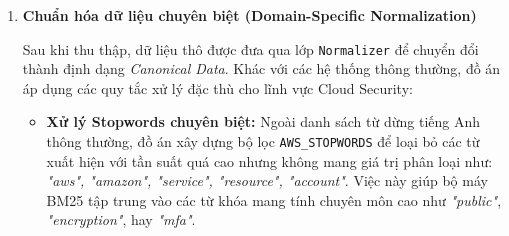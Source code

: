 \begin{enumerate}
\begin{itemize}
    \item \textbf{Cơ chế thực thi:} Sử dụng thư viện chuẩn của Python để duyệt đệ quy qua cấu trúc thư mục các provider AWS của thư viện Prowler đã cài đặt.
    \item \textbf{Dữ liệu trích xuất:} Hệ thống tập trung thu thập các tệp metadata dạng JSON. Mỗi tệp này chứa đầy đủ thông tin về một bài kiểm tra an ninh, bao gồm: \textit{CheckID}, mã lệnh khắc phục (\textit{Remediation Code}), mức độ nghiêm trọng và các rủi ro liên quan.
\end{itemize}


    \subsubsection*{Thu thập dữ liệu chiến lược từ AWS Security Maturity Model}
    \begin{itemize}
    \item \textbf{Chiến lược quét theo giai đoạn:} Agent thực hiện quét theo 4 giai đoạn (\textit{Phases}) của mô hình trưởng thành: \textit{Quick Wins, Foundational, Efficient} và \textit{Optimized}.
    \item \textbf{Bóc tách ngữ nghĩa dựa trên tiêu đề:} Thay vì lấy văn bản thô, Agent sử dụng \texttt{BeautifulSoup} để phân tích cấu trúc HTML, trích xuất thông tin theo các từ khóa mục tiêu (\textit{Keywords}) như: \textit{Risk Mitigation}, \textit{How to check}, và \textit{Guidance for assessments}.
\end{itemize}


    \item \textbf{Chuẩn hóa dữ liệu chuyên biệt (Domain-Specific Normalization)}

    Sau khi thu thập, dữ liệu thô được đưa qua lớp \texttt{Normalizer} để chuyển đổi thành định dạng \textit{Canonical Data}. Khác với các hệ thống thông thường, đồ án áp dụng các quy tắc xử lý đặc thù cho lĩnh vực Cloud Security:

    \begin{itemize}
        \item \textbf{Xử lý Stopwords chuyên biệt:} Ngoài danh sách từ dừng tiếng Anh thông thường, đồ án xây dựng bộ lọc \texttt{AWS\_STOPWORDS} để loại bỏ các từ xuất hiện với tần suất quá cao nhưng không mang giá trị phân loại như: \textit{"aws", "amazon", "service", "resource", "account"}. Việc này giúp bộ máy BM25 tập trung vào các từ khóa mang tính chuyên môn cao như \textit{"public"}, \textit{"encryption"}, hay \textit{"mfa"}.


\end{itemize}
\end{enumerate}
